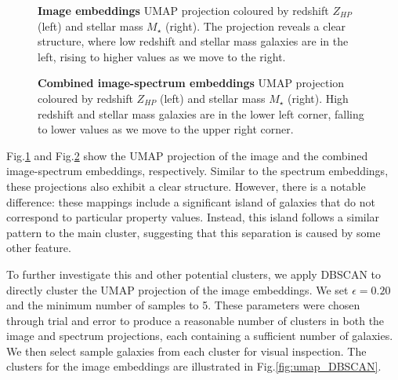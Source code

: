 \documentclass[a4paper,12pt]{article}
\begin{document}
\begin{figure}[H]
    \centering
    \caption{\textbf{Image embeddings} UMAP projection coloured by redshift $Z_{HP}$ (left) and stellar mass $M_{\star}$ (right). The projection reveals a clear structure, where low redshift and stellar mass galaxies are in the left, rising to higher values as we move to the right.}
    \label{fig:umap_of_images}
\end{figure}


\begin{figure}[H]
    \centering
    \caption{ \textbf{Combined image-spectrum embeddings} UMAP projection coloured by redshift $Z_{HP}$ (left) and stellar mass $M_{\star}$ (right). High redshift and stellar mass galaxies are in the lower left corner, falling to lower values as we move to the upper right corner.}
    \label{fig:umap_of_both}
\end{figure}

Fig.\ref{fig:umap_of_images} and Fig.\ref{fig:umap_of_both} show the UMAP projection of the image and the combined image-spectrum embeddings, respectively. Similar to the spectrum embeddings, these projections also exhibit a clear structure. However, there is a notable difference: these mappings include a significant island of galaxies that do not correspond to particular property values. Instead, this island follows a similar pattern to the main cluster, suggesting that this separation is caused by some other feature.

To further investigate this and other potential clusters, we apply DBSCAN to directly cluster the UMAP projection of the image embeddings. We set $\epsilon = 0.20$ and the minimum number of samples to 5. These parameters were chosen through trial and error to produce a reasonable number of clusters in both the image and spectrum projections, each containing a sufficient number of galaxies. We then select sample galaxies from each cluster for visual inspection. The clusters for the image embeddings are illustrated in Fig.\ref{fig:umap_DBSCAN}.
\end{document}
